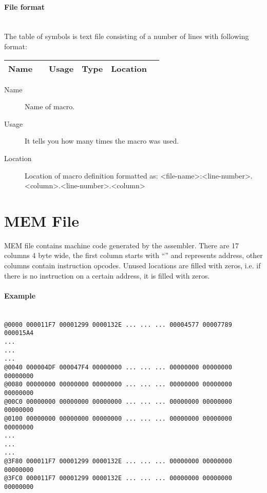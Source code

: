     \paragraph{File format}
        ~\\
        The table of symbols is text file consisting of a number of lines with following format:\\
        \begin{tabular}{|cccccc|}
            \hline
            Name & & Usage & Type & Location \\
            \hline
        \end{tabular}

    \begin{description}
        \item[Name]
            Name of macro.
        \item[Usage]
            It tells you how many times the macro was used.
        \item[Location]
            Location of macro definition formatted as: <file-name>:<line-number>.<column>.<line-number>.<column>
    \end{description}

\clearpage
\section{MEM File}
    MEM file contains machine code generated by the assembler. There are 17 columns 4 byte wide, the first column starts with ``\@'' and represents address, other columns contain instruction opcodes. Unused locations are filled with zeros, i.e. if there is no instruction on a certain address, it is filled with zeros.

    \paragraph{Example}
        ~\\
        \verb'@0000 000011F7 00001299 0000132E ... ... ... 00004577 00007789 000015A4'\\
        \verb'...'\\
        \verb'...'\\
        \verb'...'\\
        \verb'@0040 000004DF 000047F4 00000000 ... ... ... 00000000 00000000 00000000'\\
        \verb'@0080 00000000 00000000 00000000 ... ... ... 00000000 00000000 00000000'\\
        \verb'@00C0 00000000 00000000 00000000 ... ... ... 00000000 00000000 00000000'\\
        \verb'@0100 00000000 00000000 00000000 ... ... ... 00000000 00000000 00000000'\\
        \verb'...'\\
        \verb'...'\\
        \verb'...'\\
        \verb'@3F80 000011F7 00001299 0000132E ... ... ... 00000000 00000000 00000000'\\
        \verb'@3FC0 000011F7 00001299 0000132E ... ... ... 00000000 00000000 00000000'\\

